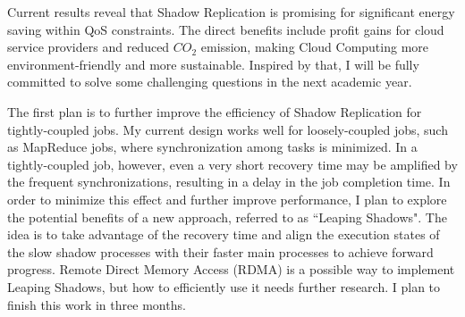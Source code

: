 Current results reveal that Shadow Replication is promising for significant energy saving within QoS constraints. The direct benefits include profit gains for cloud service providers and reduced $CO_2$ emission, making Cloud Computing more environment-friendly and more sustainable. Inspired by that, I will be fully committed to solve some challenging questions in the next academic year.

The first plan is to further improve the efficiency of Shadow Replication for tightly-coupled jobs. My current design works well for loosely-coupled jobs, such as MapReduce jobs, where synchronization among tasks is minimized. 
 In a tightly-coupled job, however, even a very short recovery time may be amplified by the frequent synchronizations,  
 resulting in a delay in the job completion time. In order to minimize this effect and further improve performance, I plan to explore the potential benefits of a new approach, referred to as ``Leaping Shadows". The idea is to take advantage of the recovery time and align the execution states of the slow shadow processes with their faster main processes to achieve forward progress. Remote Direct Memory Access (RDMA) is a possible way to implement Leaping Shadows, but how to efficiently use it needs further research. I plan to finish this work in three months. 

